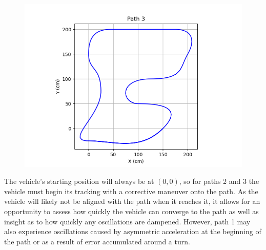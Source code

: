 \documentclass[12pt]{article}
\begin{document}
\begin{flushleft}
\begin{figure}[H]
\label{img:path2}
\endminipage\\
\includegraphics[width=\linewidth]{images/pathData/path3}
\label{img:path3}
\endminipage
\end{figure}

The vehicle's starting position will always be at $(0,0)$, so for paths 2 and 3 the vehicle must begin its tracking with a corrective maneuver onto the path. As the vehicle will likely not be aligned with the path when it reaches it, it allows for an opportunity to assess how quickly the vehicle can converge to the path as well as insight as to how quickly any oscillations are dampened. However, path 1 may also experience oscillations caused by asymmetric acceleration at the beginning of the path or as a result of error accumulated around a turn.


\end{flushleft}
\end{document}
